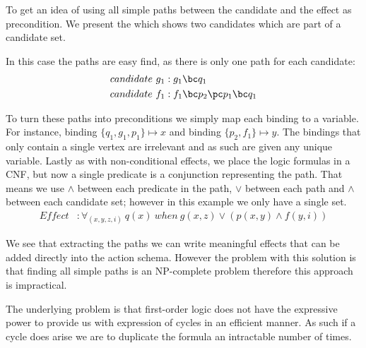 \documentclass[\master/Master.tex]{subfiles}
\begin{document}
\begin{example}\label{ex:ca:hyp-paths} To get an idea of using all simple paths between the candidate and the effect as precondition. 
	We present the  which shows two candidates which are part of a candidate set.
	
	In this case the paths are easy find, as there is only one path for each candidate:
	\begin{equation*}
		\begin{split}	
			candidate~ g_1 &: g_1 \bc q_1 \\
			candidate~ f_1 &: f_1 \bc p_2 \pc p_1 \bc q_1
		\end{split}
	\end{equation*}
	
	To turn these paths into preconditions we simply map each binding to a variable. For instance, binding $\{q_1,g_1,p_1\} \mapsto x$ and binding $\{p_2,f_1\} \mapsto y$. The bindings that only contain a single vertex are irrelevant and as such are given any unique variable.
	Lastly as with non-conditional effects, we place the logic formulas in a CNF, but now a single predicate is a conjunction representing the path.
	That means we use $\land$ between each predicate in the path, $\lor$ between each path and $\land$ between each candidate set; however in this example we only have a single set.	
	\begin{equation*}
		\begin{split}	
		Effect&: \forall_{(x,y,z,i)} ~q(x)~ when~ g(x,z) \lor ( p(x,y) \land f(y,i) )
		\end{split}
	\end{equation*}
	
	We see that extracting the paths we can write meaningful effects that can be added directly into the action schema.
	However the problem with this solution is that finding all simple paths is an NP-complete problem therefore this approach is impractical. 
	
\end{example}

The underlying problem is that first-order logic does not have the expressive power to provide us with expression of cycles in an efficient manner. As such if a cycle does arise we are to duplicate the formula an intractable number of times.
\end{document}
